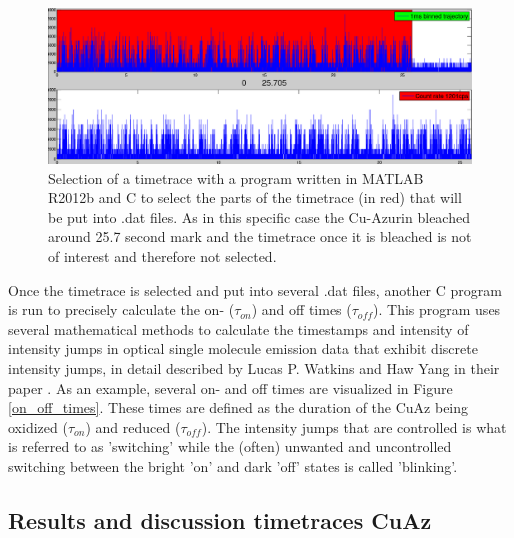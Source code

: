 \documentclass[twoside,single]{lion-msc}
\begin{document}
\begin{figure}[ht!]
\centering
\includegraphics[width=\textwidth]{timetrace_selection}
\caption{Selection of a timetrace with a program written in MATLAB R2012b and C to select the parts of the timetrace (in red) that will be put into .dat files. As in this specific case the Cu-Azurin bleached around 25.7 second mark and the timetrace once it is bleached is not of interest and therefore not selected.}
\label{timetrace_selection}
\end{figure}

Once the timetrace is selected and put into several .dat files, another C program is run to precisely calculate the  on- ($\tau_{on}$) and off times ($\tau_{off}$). This program uses several mathematical methods to calculate the timestamps and intensity of intensity jumps in optical single molecule emission data that exhibit discrete intensity jumps, in detail described by Lucas P. Watkins and Haw Yang in their paper \cite{And2004}. As an example, several on- and off times are visualized in Figure \ref{on_off_times}. These times are defined as the duration of the CuAz being oxidized ($\tau_{on}$) and reduced ($\tau_{off}$). The intensity jumps that are controlled is what is referred to as 'switching' while the (often) unwanted and uncontrolled switching between the bright 'on' and dark 'off' states is called 'blinking'. 

\subsection*{Results and discussion timetraces CuAz}
\end{document}
